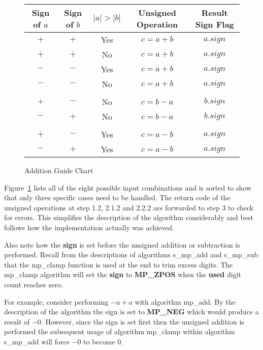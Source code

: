 \documentclass[b5paper]{book}
\begin{document}
\begin{figure}[here]
\begin{small}
\begin{center}
\begin{tabular}{|c|c|c|c|c|}
\hline \textbf{Sign of $a$} & \textbf{Sign of $b$} & \textbf{$\vert a \vert > \vert b \vert $} & \textbf{Unsigned Operation} & \textbf{Result Sign Flag} \\
\hline $+$ & $+$ & Yes & $c = a + b$ & $a.sign$ \\
\hline $+$ & $+$ & No  & $c = a + b$ & $a.sign$ \\
\hline $-$ & $-$ & Yes & $c = a + b$ & $a.sign$ \\
\hline $-$ & $-$ & No  & $c = a + b$ & $a.sign$ \\
\hline &&&&\\

\hline $+$ & $-$ & No  & $c = b - a$ & $b.sign$ \\
\hline $-$ & $+$ & No  & $c = b - a$ & $b.sign$ \\

\hline &&&&\\

\hline $+$ & $-$ & Yes & $c = a - b$ & $a.sign$ \\
\hline $-$ & $+$ & Yes & $c = a - b$ & $a.sign$ \\

\hline
\end{tabular}
\end{center}
\end{small}
\caption{Addition Guide Chart}
\label{fig:AddChart}
\end{figure}

Figure~\ref{fig:AddChart} lists all of the eight possible input combinations and is sorted to show that only three specific cases need to be handled.  The 
return code of the unsigned operations at step 1.2, 2.1.2 and 2.2.2 are forwarded to step 3 to check for errors.  This simplifies the description
of the algorithm considerably and best follows how the implementation actually was achieved.

Also note how the \textbf{sign} is set before the unsigned addition or subtraction is performed.  Recall from the descriptions of algorithms
s\_mp\_add and s\_mp\_sub that the mp\_clamp function is used at the end to trim excess digits.  The mp\_clamp algorithm will set the \textbf{sign}
to \textbf{MP\_ZPOS} when the \textbf{used} digit count reaches zero.  

For example, consider performing $-a + a$ with algorithm mp\_add.  By the description of the algorithm the sign is set to \textbf{MP\_NEG} which would
produce a result of $-0$.  However, since the sign is set first then the unsigned addition is performed the subsequent usage of algorithm mp\_clamp 
within algorithm s\_mp\_add will force $-0$ to become $0$.  
\end{document}
